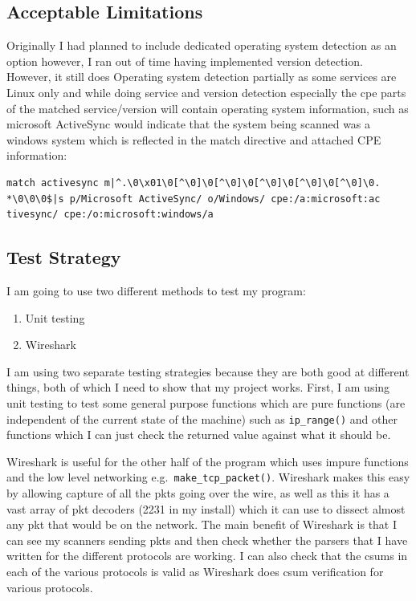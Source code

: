 \documentclass[titlepage]{article}
\let\Oldsubsection\subsection{}
\renewcommand{\subsection}{\FloatBarrier\Oldsubsection}
\begin{document}
\subsection{Acceptable Limitations}

Originally I had planned to include dedicated operating system detection as an option
however, I ran out of time having implemented version detection. However, it still does
Operating system detection partially as some \glspl{service} are Linux only and while doing
\gls{service} and version detection especially the \gls{cpe} parts
of the matched \gls{service}/version will contain operating system information, such as
microsoft ActiveSync would indicate that the system being scanned was a windows system
which is reflected in the match directive and attached CPE information:
\begin{verbatim}
match activesync m|^.\0\x01\0[^\0]\0[^\0]\0[^\0]\0[^\0]\0[^\0]\0.
*\0\0\0$|s p/Microsoft ActiveSync/ o/Windows/ cpe:/a:microsoft:ac
tivesync/ cpe:/o:microsoft:windows/a
\end{verbatim}

\subsection{Test Strategy}

I am going to use two different methods to test my program:
\begin{enumerate}
\item{Unit testing}
\item{Wireshark}
\end{enumerate}
I am using two separate testing strategies because they are both good at different things,
both of which I need to show that my project works. First, I am using unit testing to test
some general purpose functions which are pure functions (are independent of the current state
of the machine) such as \verb|ip_range()| and other functions which I can just check the returned
value against what it should be.

Wireshark is useful for the other half of the program which uses impure functions and the low level 
networking e.g.\ \verb|make_tcp_packet()|. Wireshark makes this easy by allowing capture of all the 
\glspl{pkt} going over the wire, as well as this it has a vast array of \gls{pkt} decoders (2231 in 
my install) which it can use to dissect almost any \gls{pkt} that would be on the network. The main 
benefit of Wireshark is that I can see my scanners sending \glspl{pkt} and then check whether the 
parsers that I have written for the different protocols are working. I can also check that the 
\glspl{csum} in each of the various protocols is valid as Wireshark does \gls{csum} verification for 
various protocols. 
\end{document}
